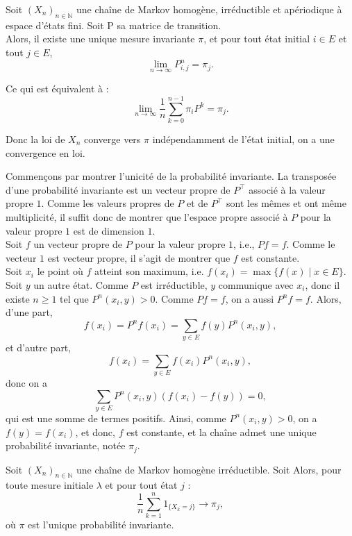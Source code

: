 \documentclass{article}
\begin{document}
\begin{tcolorbox}[colback=white,colframe=red!80!black,title=Théorème de convergence]
Soit $(X_n)_{n \in \mathbb{N}}$ une chaîne de Markov homogène, irréductible et apériodique à espace d'états fini. Soit P sa matrice de transition.\\
Alors, il existe une unique mesure invariante $\pi$, et pour tout état initial $i \in E$ et tout $j \in E$,
\[
\lim_{n \to \infty} P^n_{i,j} = \pi_j.
\]

Ce qui est équivalent à :
\[
\lim_{n \to \infty} \frac{1}{n} \sum_{k=0}^{n-1} \pi_i P^k = \pi_j.
\]

Donc la loi de $X_n$ converge vers $\pi$ indépendamment de l'état initial, on a une convergence en loi.
\end{tcolorbox}

\begin{tcolorbox}[colback=white, colframe=green!80!black, title=Démonstration, breakable]
Commençons par montrer l'unicité de la probabilité invariante.
La transposée d'une probabilité invariante est un vecteur propre de $P^{\top}$ associé à la valeur propre $1$.
Comme les valeurs propres de $P$ et de $P^{\top}$ sont les mêmes et ont même multiplicité, il suffit donc de montrer que l'espace propre associé à $P$ pour la valeur propre $1$ est de dimension $1$. \\
Soit $f$ un vecteur propre de $P$ pour la valeur propre $1$, i.e., $Pf = f$. Comme le vecteur $1$ est vecteur propre, il s'agit de montrer que $f$ est constante. \\

Soit $x_i$ le point où $f$ atteint son maximum, i.e. $f(x_i) = \max\{f(x) \mid x \in E\}$. Soit $y$ un autre état. Comme $P$ est irréductible, $y$ communique avec $x_i$, donc il existe $n \geq 1$ tel que $P^n(x_i, y) > 0$. Comme $Pf = f$, on a aussi $P^n f = f$. Alors, d'une part,
\[
f(x_i) = P^n f(x_i) = \sum_{y \in E} f(y) P^n(x_i, y),
\]
et d'autre part,
\[
f(x_i) = \sum_{y \in E} f(x_i) P^n(x_i, y),
\]
donc on a
\[
\sum_{y \in E} P^n(x_i, y) \left(f(x_i) - f(y)\right) = 0,
\]
qui est une somme de termes positifs. Ainsi, comme $P^n(x_i, y) > 0$, on a $f(y) = f(x_i)$, et donc, $f$ est constante, et la chaîne admet une unique probabilité invariante, notée $\pi_j$.
\end{tcolorbox}

\begin{tcolorbox}[colback=white,colframe=red!80!black,title=Valeur de convergence]
Soit $(X_n)_{n \in \mathbb{N}}$ une chaîne de Markov homogène irréductible. Soit Alors, pour toute mesure initiale $\lambda$ et pour tout état $j$ :
\[
\frac{1}{n} \sum_{k=1}^{n} 1_{\{X_k = j\}} \rightarrow \pi_j,
\]
où $\pi$ est l'unique probabilité invariante.
\end{tcolorbox}
\end{document}
